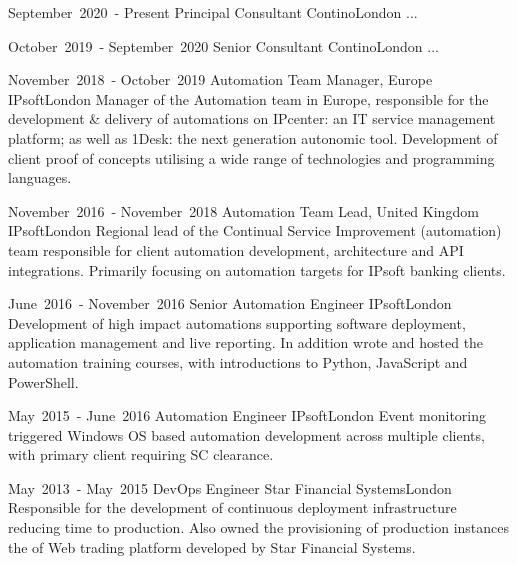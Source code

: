 
\cventry %
  {\mbox{September 2020 -} \mbox{Present}}
  {Principal Consultant}
  {Contino}{London}{}
  { 
    ...
  }

\cventry %
  {\mbox{October 2019 -} \mbox{September 2020}}
  {Senior Consultant}
  {Contino}{London}{}
  {
    ...  
  }

\cventry %
  {\mbox{November 2018 -} \mbox{October 2019}}
  {Automation Team Manager, Europe}
  {IPsoft}{London}{}
  {
    Manager of the Automation team in Europe, responsible for the 
    development \& delivery of automations on IPcenter: an IT service management 
    platform; as well as 1Desk: the next generation autonomic tool. 
    Development of client proof of concepts utilising a wide range of technologies and programming languages.\\
  }

\cventry %
  {\mbox{November 2016 -} \mbox{November 2018}}
  {Automation Team Lead, United Kingdom}
  {IPsoft}{London}{}
  {
    Regional lead of the Continual Service Improvement (automation) team responsible 
    for client automation development, architecture and API integrations. 
    Primarily focusing on automation targets for IPsoft banking clients.\\
  }

\cventry %
  {\mbox{June 2016 -} \mbox{November 2016}}
  {Senior Automation Engineer}
  {IPsoft}{London}{}
  {
    Development of high impact automations supporting software deployment, 
    application management and live reporting. In addition wrote and hosted 
    the automation training courses, with introductions to Python, JavaScript and PowerShell.\\
  }

\cventry %
  {\mbox{May 2015 -} \mbox{June 2016}}
  {Automation Engineer}
  {IPsoft}{London}{}
  {
    Event monitoring triggered Windows OS based automation development across 
    multiple clients, with primary client requiring SC clearance.\\
  }

\cventry %
  {\mbox{May 2013 -} \mbox{May 2015}}
  {DevOps Engineer}
  {Star Financial Systems}{London}{}
  {
    Responsible for the development of continuous deployment infrastructure 
    reducing time to production. Also owned the provisioning of production 
    instances the of Web trading platform developed by Star Financial Systems.\\
  }

